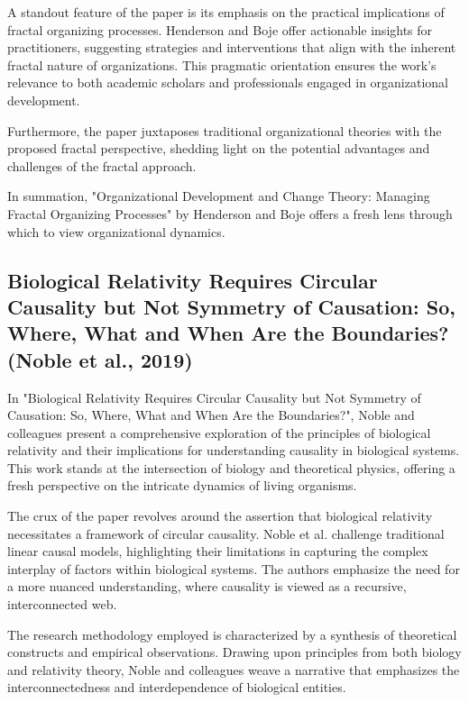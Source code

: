 \documentclass[sn-nature]{sn-jnl}%
\theoremstyle{thmstyleone}%
\theoremstyle{thmstyletwo}%
\theoremstyle{thmstylethree}%
\begin{document}
A standout feature of the paper is its emphasis on the practical implications of fractal organizing processes. Henderson and Boje offer actionable insights for practitioners, suggesting strategies and interventions that align with the inherent fractal nature of organizations. This pragmatic orientation ensures the work's relevance to both academic scholars and professionals engaged in organizational development.

Furthermore, the paper juxtaposes traditional organizational theories with the proposed fractal perspective, shedding light on the potential advantages and challenges of the fractal approach.

In summation, "Organizational Development and Change Theory: Managing Fractal Organizing Processes" by Henderson and Boje offers a fresh lens through which to view organizational dynamics.  

\subsection{Biological Relativity Requires Circular Causality but Not Symmetry of Causation: So, Where, What and When Are the Boundaries? (Noble et al., 2019)\cite{noble_biological_2019}}

In "Biological Relativity Requires Circular Causality but Not Symmetry of Causation: So, Where, What and When Are the Boundaries?", Noble and colleagues present a comprehensive exploration of the principles of biological relativity and their implications for understanding causality in biological systems. This work stands at the intersection of biology and theoretical physics, offering a fresh perspective on the intricate dynamics of living organisms.

The crux of the paper revolves around the assertion that biological relativity necessitates a framework of circular causality. Noble et al. challenge traditional linear causal models, highlighting their limitations in capturing the complex interplay of factors within biological systems. The authors emphasize the need for a more nuanced understanding, where causality is viewed as a recursive, interconnected web.

The research methodology employed is characterized by a synthesis of theoretical constructs and empirical observations. Drawing upon principles from both biology and relativity theory, Noble and colleagues weave a narrative that emphasizes the interconnectedness and interdependence of biological entities.
\end{document}
